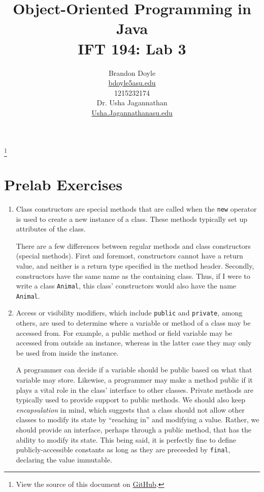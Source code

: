 \documentclass[leqno, 11pt]{article}
\title{\vspace{6ex}Object-Oriented Programming in Java\\
  \Large IFT 194: Lab 3}
\author{Brandon Doyle\\
\href{mailto:bdoyle@asu.edu}{bdoyle5\at{}asu.edu}\\
1215232174\\[1em]
Dr. Usha Jagannathan\\
\href{mailto:Usha.Jagannathan@asu.edu}{Usha.Jagannathan\at{}asu.edu}}
\newcommand\blfootnote[1]{%
  \begingroup
    \renewcommand\thefootnote{}\footnote{#1}
    \addtocounter{footnote}{-1}
  \endgroup
}
\begin{document}
\begin{titlepage}
\clearpage\maketitle
\thispagestyle{empty}
\end{titlepage}
\tableofcontents
\newpage
\blfootnote{View the source of this document on \href{https://github.com/bjd2385/IFT_194_labs/blob/master/\jobname.tex}{GitHub}.}
\section{Prelab Exercises}
\begin{enumerate}
  \item Class constructors are special methods that are called when the \texttt{new} operator is used to create a new instance of a class. These methods typically set up attributes of the class.

        There are a few differences between regular methods and class constructors (special methods). First and foremost, constructors cannot have a return value, and neither is a return type specified in the method header. Secondly, constructors have the same name as the containing class. Thus, if I were to write a class \texttt{Animal}, this class' constructors would also have the name \texttt{Animal}.
  \item Access or visibility modifiers, which include \texttt{public} and \texttt{private}, among others, are used to determine where a variable or method of a class may be accessed from. For example, a public method or field variable may be accessed from outside an instance, whereas in the latter case they may only be used from inside the instance.

        A programmer can decide if a variable should be public based on what that variable may store. Likewise, a programmer may make a method public if it plays a vital role in the class' interface to other classes. Private methods are typically used to provide support to public methods. We should also keep \textit{encapsulation} in mind, which suggests that a class should not allow other classes to modify its state by ``reaching in'' and modifying a value. Rather, we should provide an interface, perhaps through a public method, that has the ability to modify its state. This being said, it is perfectly fine to define publicly-accessible constants as long as they are preceeded by \texttt{final}, declaring the value immutable.


\end{enumerate}
\end{document}
